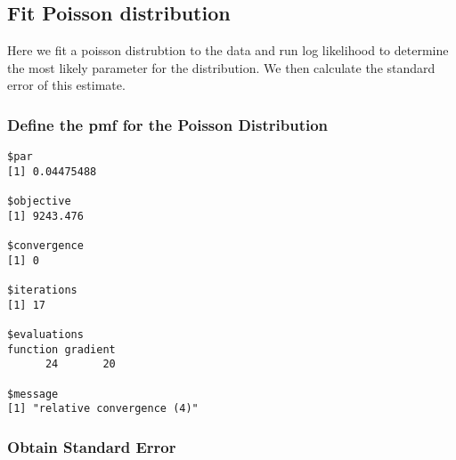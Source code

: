 \documentclass[]{book}
\newenvironment{Shaded}{\begin{snugshade}}{\end{snugshade}}
\newcommand{\KeywordTok}[1]{\textcolor[rgb]{0.13,0.29,0.53}{\textbf{#1}}}
\newcommand{\DataTypeTok}[1]{\textcolor[rgb]{0.13,0.29,0.53}{#1}}
\newcommand{\DecValTok}[1]{\textcolor[rgb]{0.00,0.00,0.81}{#1}}
\newcommand{\FloatTok}[1]{\textcolor[rgb]{0.00,0.00,0.81}{#1}}
\newcommand{\StringTok}[1]{\textcolor[rgb]{0.31,0.60,0.02}{#1}}
\newcommand{\OtherTok}[1]{\textcolor[rgb]{0.56,0.35,0.01}{#1}}
\newcommand{\ControlFlowTok}[1]{\textcolor[rgb]{0.13,0.29,0.53}{\textbf{#1}}}
\newcommand{\OperatorTok}[1]{\textcolor[rgb]{0.81,0.36,0.00}{\textbf{#1}}}
\newcommand{\NormalTok}[1]{#1}
\theoremstyle{definition}
\theoremstyle{definition}
\theoremstyle{definition}
\theoremstyle{remark}
\begin{document}
\subsection{Fit Poisson distribution}\label{fit-poisson-distribution}

Here we fit a poisson distrubtion to the data and run log likelihood to
determine the most likely parameter for the distribution. We then
calculate the standard error of this estimate.

\subsubsection{Define the pmf for the Poisson
Distribution}\label{define-the-pmf-for-the-poisson-distribution}

\begin{Shaded}
\end{Shaded}

\begin{verbatim}
$par
[1] 0.04475488

$objective
[1] 9243.476

$convergence
[1] 0

$iterations
[1] 17

$evaluations
function gradient 
      24       20 

$message
[1] "relative convergence (4)"
\end{verbatim}

\subsubsection{Obtain Standard Error}\label{obtain-standard-error}

\begin{Shaded}
\end{Shaded}
\end{document}
